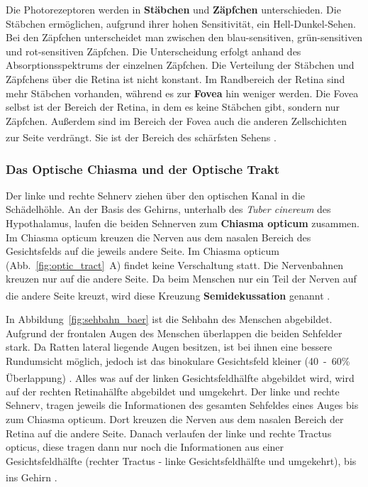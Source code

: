 \noindent Die Photorezeptoren werden in \textbf{Stäbchen}  und \textbf{Zäpfchen}  unterschieden. Die Stäbchen ermöglichen, aufgrund ihrer hohen Sensitivität, ein Hell-Dunkel-Sehen. Bei den Zäpfchen unterscheidet man zwischen den blau-sensitiven, grün-sensitiven und rot-sensitiven Zäpfchen. Die Unterscheidung erfolgt anhand des Absorptionsspektrums der einzelnen Zäpfchen. Die Verteilung der Stäbchen und Zäpfchens über die Retina ist nicht konstant. Im Randbereich der Retina sind mehr Stäbchen vorhanden, während es zur \textbf{Fovea}  hin weniger werden. Die Fovea selbst ist der Bereich der Retina, in dem es keine Stäbchen gibt, sondern nur Zäpfchen. Außerdem sind im Bereich der Fovea auch die anderen Zellschichten zur Seite verdrängt. Sie ist der Bereich des schärfsten Sehens \textsuperscript{\cite[Kap.~10]{neurowissenschaften_baer}}.

\subsubsection*{Das Optische Chiasma und der Optische Trakt}

Der linke und rechte Sehnerv ziehen über den optischen Kanal in die Schädelhöhle. An der Basis des Gehirns, unterhalb des \textit{Tuber cinereum} des Hypothalamus, laufen die beiden Sehnerven zum \textbf{Chiasma opticum}  zusammen. 
Im Chiasma opticum kreuzen die Nerven aus dem nasalen Bereich des Gesichtsfelds auf die jeweils andere Seite. Im Chiasma opticum (Abb.~\ref{fig:optic_tract}~A) findet keine Verschaltung statt. Die Nervenbahnen kreuzen nur auf die andere Seite.
Da beim Menschen nur ein Teil der Nerven auf die andere Seite kreuzt, wird diese Kreuzung \textbf{Semidekussation}  genannt \textsuperscript{\cite[Kap.~15]{crossman2014neuroanatomy}}. 

In Abbildung~\ref{fig:sehbahn_baer} ist die Sehbahn des Menschen abgebildet. Aufgrund der frontalen Augen des Menschen überlappen die beiden Sehfelder stark. Da Ratten lateral liegende Augen besitzen, ist bei ihnen eine bessere Rundumsicht möglich, jedoch ist das binokulare Gesichtsfeld kleiner (40~-~60\% Überlappung) \textsuperscript{\cite[Kap.~30]{paxinos2014rat}}.
Alles was auf der linken Gesichtsfeldhälfte abgebildet wird, wird auf der rechten Retinahälfte abgebildet und umgekehrt. Der linke und rechte Sehnerv, tragen jeweils die Informationen des gesamten Sehfeldes eines Auges bis zum Chiasma opticum. Dort kreuzen die Nerven aus dem nasalen Bereich der Retina auf die andere Seite. Danach verlaufen der linke und rechte Tractus opticus,  diese tragen dann nur noch die Informationen aus einer Gesichtsfeldhälfte (rechter Tractus - linke Gesichtsfeldhälfte und umgekehrt), bis ins Gehirn \textsuperscript{\cite[Kap.~15]{crossman2014neuroanatomy}}.

